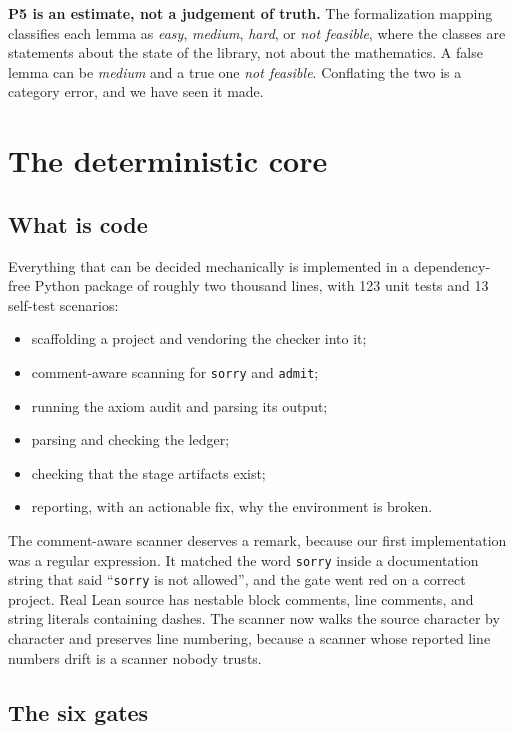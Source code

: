\documentclass[11pt]{article}
\newcommand{\Lean}{Lean}
\newcommand{\code}[1]{\texttt{#1}}
\begin{document}
\textbf{P5 is an estimate, not a judgement of truth.} The formalization
mapping classifies each lemma as \emph{easy}, \emph{medium}, \emph{hard}, or
\emph{not feasible}, where the classes are statements about the state of the
library, not about the mathematics. A false lemma can be \emph{medium} and a
true one \emph{not feasible}. Conflating the two is a category error, and we
have seen it made.

\section{The deterministic core}

\subsection{What is code}

Everything that can be decided mechanically is implemented in a dependency-free
Python package of roughly two thousand lines, with 123 unit tests and 13
self-test scenarios:

\begin{itemize}
\item scaffolding a project and vendoring the checker into it;
\item comment-aware scanning for \code{sorry} and \code{admit};
\item running the axiom audit and parsing its output;
\item parsing and checking the ledger;
\item checking that the stage artifacts exist;
\item reporting, with an actionable fix, why the environment is broken.
\end{itemize}

The comment-aware scanner deserves a remark, because our first implementation
was a regular expression. It matched the word \code{sorry} inside a
documentation string that said ``\code{sorry} is not allowed'', and the gate
went red on a correct project. Real \Lean{} source has nestable block comments,
line comments, and string literals containing dashes. The scanner now walks the
source character by character and preserves line numbering, because a scanner
whose reported line numbers drift is a scanner nobody trusts.

\subsection{The six gates}
\end{document}
